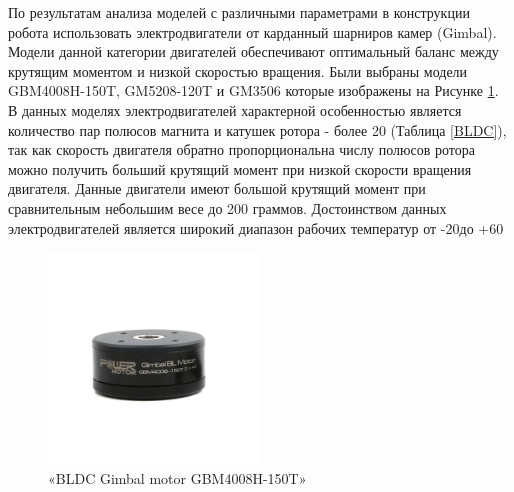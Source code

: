 По результатам анализа моделей с различными параметрами в конструкции робота использовать электродвигатели от карданный шарниров камер (Gimbal). Модели данной категории двигателей обеспечивают оптимальный баланс между крутящим моментом и низкой скоростью вращения. Были выбраны модели GBM4008H-150T, GM5208-120T и GM3506 которые изображены на Рисунке \ref{GBM4008H}. В данных моделях электродвигателей характерной особенностью является количество пар полюсов магнита и катушек ротора - более 20 (Таблица \ref{BLDC}), так как скорость двигателя обратно пропорциональна числу полюсов ротора можно получить больший крутящий момент при низкой скорости вращения двигателя. Данные двигатели имеют большой крутящий момент при сравнительным небольшим весе до 200 граммов. Достоинством данных электродвигателей является широкий диапазон рабочих температур от -20\textdegree  до +60\textdegree 


\begin{figure}[H]
	\centering
	\includegraphics[width=0.5\textwidth]{Src/images/GM4008H-1.png}
	\caption{«BLDC Gimbal motor GBM4008H-150T»}
	\label{GBM4008H}
\end{figure}
 


